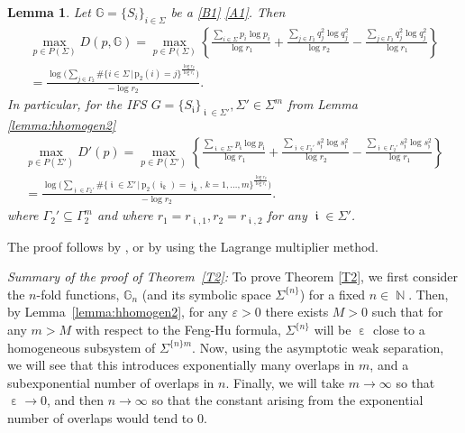 \documentclass[a4paper, 11pt]{article}
\DeclareMathOperator{\N}{\mathbb{N}}
\DeclareMathOperator{\iii}{\mathfrak{i}}
\DeclareMathOperator{\jjj}{\mathfrak{j}}
\DeclareMathOperator{\eps}{\varepsilon}
\numberwithin{equation}{section}
\theoremstyle{plain}
\newtheorem{lemma}[theorem]{Lemma}
\theoremstyle{remark}
\theoremstyle{definition}
\begin{document}
\begin{lemma}\label{lem:lagrange}
	Let $\mathbb{G} = \{S_i\}_{i \in \Sigma}$ be a \ref{B1} \ref{A1}. Then 
	\begin{multline*}
\max_{p\in P(\Sigma)}D(p, \mathbb{G}) =
	\max_{p\in P(\Sigma)}\left\{\frac{\sum\limits_{i \in \Sigma} p_i \log p_i}{\log r_1}
	+ \frac{\sum\limits_{j \in \Gamma_2} q_j^2 \log q_j^2}{\log r_2}
	- \frac{\sum\limits_{j \in \Gamma_2} q_j^2 \log q_j^2}{\log r_1}\right\} \\
=\frac{\log \Big(\sum\limits_{j\in\Gamma_2}\#\{i\in\Sigma\, |\, \mathrm{p}_2(i)=j\}^{\frac{\log r_2}{\log r_1}}\Big)}{-\log r_2}.
\end{multline*}
In particular, for the IFS $G = \{S_{\iii}\}_{\iii \in \Sigma'},\Sigma' \in \Sigma^m$ from Lemma \ref{lemma:hhomogen2}
\begin{multline*}
	\max_{p \in P(\Sigma')}D'(p) = \max_{p\in P(\Sigma')}\left\{\frac{\sum\limits_{{\iii} \in \Sigma'} p_{\iii} \log p_{\iii}}{\log r_1}
	+ \frac{\sum\limits_{{\jjj} \in \Gamma_2'} s_{\jjj}^2 \log s_{\jjj}^2}{\log r_2}
	- \frac{\sum\limits_{{\jjj} \in \Gamma_2'} s_{\jjj}^2 \log s_{\jjj}^2}{\log r_1}\right\} \\
=\frac{\log \Big(\sum\limits_{{\jjj}\in\Gamma_2'}\#\big\{{\iii}\in\Sigma'\, \big|\, \mathrm{p}_2({\iii}_k)={\jjj}_k,\, k = 1,\dots,m\big\}^{\frac{\log r_2}{\log r_1}}\Big)}{-\log r_2}.
\end{multline*}
where $\Gamma_2' \subseteq \Gamma_2^m$ and where $r_1 = r_{\iii,1}, r_2 = r_{\iii,2}$ for any $\iii \in \Sigma'$.
\end{lemma}

The proof follows by \cite[Proposition~3.4]{MR1183358}, or by using the Lagrange multiplier method.

\vspace{5pt}

\emph{Summary of the proof of Theorem~\ref{T2}:}
To prove Theorem \ref{T2}, we first consider the $n$-fold functions, $\mathbb{G}_n$ (and its symbolic space $\Sigma^{\{n\}}$) for a fixed $n \in \N$. Then, by Lemma~\ref{lemma:hhomogen2}, for any $\varepsilon > 0$ there exists $M>0$ such that for any $m > M$ with respect to the Feng-Hu formula, $\Sigma^{\{n\}}$ will be $\eps$ close to a homogeneous subsystem of $\Sigma^{\{n\}m}$. Now, using the asymptotic weak separation, we will see that this introduces exponentially many overlaps in $m$, and a subexponential number of overlaps in $n$. Finally, we will take $m \to \infty$ so that $\eps \to 0$, and then $n \to \infty$ so that the constant arising from the exponential number of overlaps would tend to $0$.
\end{document}
